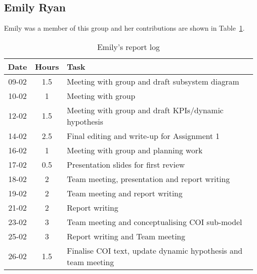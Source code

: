 
\subsection{Emily Ryan}
Emily was a member of this group and her contributions are shown in Table~\ref{tab:emily_log}. 
\begin{longtable}[c]{c|c|m{35em}}
\caption{Emily's report log}
\label{tab:emily_log}\\
\textbf{Date}& \textbf{Hours} & \textbf{Task} \\
\hline
\endfirsthead
%
\endhead
%
 09-02  &   1.5    & Meeting with group and draft subsystem diagram  \\
 10-02  &    1   & Meeting with group  \\
 12-02  &    1.5   & Meeting with group and draft KPIs/dynamic hypothesis  \\
 14-02  & 2.5  & Final editing and write-up for Assignment 1\\
 16-02 & 1 & Meeting with group and planning work\\
 17-02 & 0.5 & Presentation slides for first review\\
 18-02 & 2 & Team meeting, presentation and report writing\\
 19-02 & 2 & Team meeting and report writing\\
 21-02 & 2 & Report writing\\
 23-02 & 3 & Team meeting and conceptualising COI sub-model\\
 25-02 & 3 & Report writing and Team meeting\\
 26-02 & 1.5 & Finalise COI text, update dynamic hypothesis and team meeting\\
 
\end{longtable}

